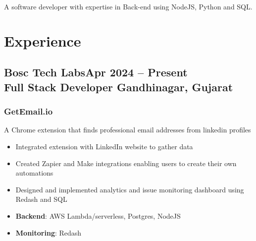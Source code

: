 \documentclass[a4paper]{article}
\newcommand{\experiencetitle}[4]{\subsection{\texorpdfstring{#1\hfill \small \textmd{#4} \\
	\textmd{#3} \hfill \textmd{#2}}{#1}}}
\begin{document}
\fancyhead[L]{
}


\fancyhead[R]{
}

\noindent
A software developer with expertise in Back-end using NodeJS, Python and SQL.

\section{Experience}
\experiencetitle{Bosc Tech Labs}{Gandhinagar, Gujarat}{Full Stack Developer}{Apr 2024 -- Present}
\subsubsection{GetEmail.io}
A Chrome extension that finds professional email addresses from linkedin profiles
\begin{itemize}
	\item Integrated extension with LinkedIn website to gather data
	\item Created Zapier and Make integrations enabling users to create their own automations
	\item Designed and implemented analytics and issue monitoring dashboard using Redash and SQL
	\item \textbf{Backend}: AWS Lambda/serverless, Postgres, NodeJS
	\item \textbf{Monitoring}: Redash
\end{itemize}

\end{document}
